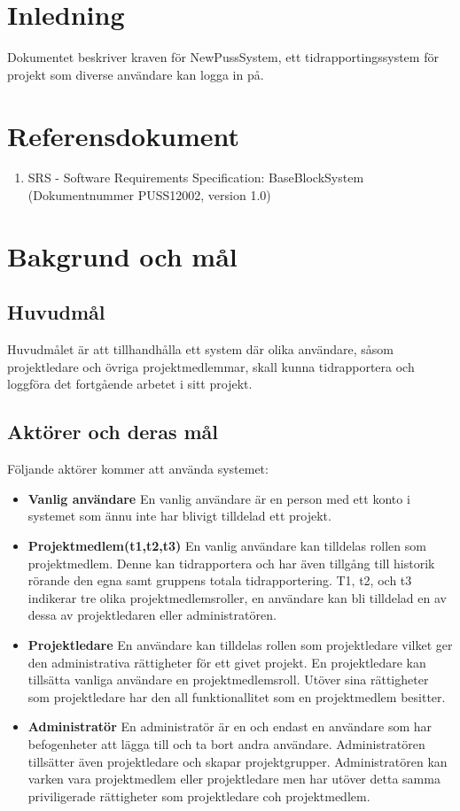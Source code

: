 \documentclass[a4paper]{article}
\begin{document}
\section{Inledning}       
Dokumentet beskriver kraven för NewPussSystem, ett tidrapportingssystem för projekt som diverse användare kan logga in på.

\section{Referensdokument}
\begin{enumerate}
\item SRS - Software Requirements Specification: BaseBlockSystem (Dokumentnummer PUSS12002, version 1.0)
\end{enumerate}
\section{Bakgrund och mål}   
\subsection{Huvudmål}
Huvudmålet är att tillhandhålla ett system där olika användare, såsom projektledare och övriga projektmedlemmar, skall kunna tidrapportera och loggföra det fortgående arbetet i sitt projekt. 

\subsection{Aktörer och deras mål}
\label{bom-aktorer}
Följande aktörer kommer att använda systemet:
\begin{itemize}
\item [] \textbf{Vanlig användare} En vanlig användare är en person med ett konto i systemet som ännu inte har blivigt tilldelad ett projekt.
\item [] \textbf{Projektmedlem(t1,t2,t3)} En vanlig användare kan tilldelas rollen som projektmedlem. Denne kan tidrapportera och har även tillgång till historik rörande den egna samt gruppens totala tidrapportering. T1, t2, och t3 indikerar tre olika projektmedlemsroller, en användare kan bli tilldelad en av dessa av projektledaren eller administratören.
\item [] \textbf{Projektledare} En användare kan tilldelas rollen som projektledare vilket ger den administrativa rättigheter för ett givet projekt. En projektledare kan tillsätta vanliga användare en projektmedlemsroll. Utöver sina rättigheter som projektledare har den all funktionallitet som en projektmedlem besitter.
\item [] \textbf{Administratör} En administratör är en och endast en användare som har befogenheter att lägga till och ta bort andra användare. Administratören tillsätter även projektledare och skapar projektgrupper. Administratören kan varken vara projektmedlem eller projektledare men har utöver detta samma priviligerade rättigheter som projektledare coh projektmedlem.
\end{itemize}
\newpage
\end{document}
